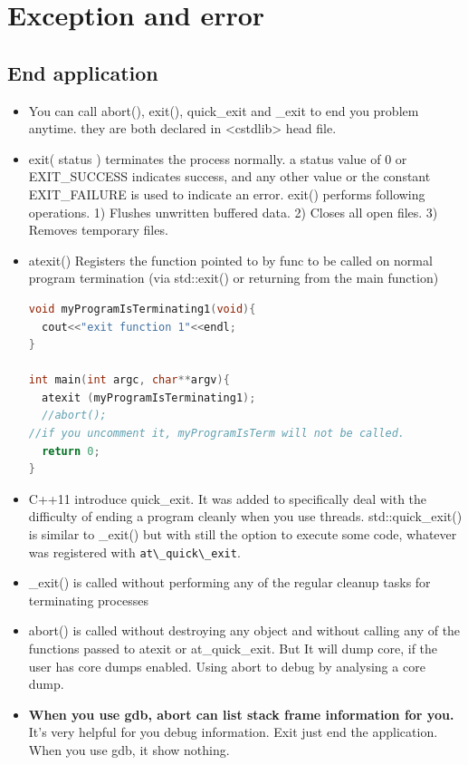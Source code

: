 \documentclass[a4paper,12pt,twoside]{book}
\begin{document}
\section{Exception and error}
\subsection{End application}
\begin{itemize}
\item You can call abort(), exit(), quick\_exit and  \_exit to end you problem anytime. they are both declared in <cstdlib> head file.

\item exit( status ) terminates the process normally.
a status value of 0 or EXIT\_SUCCESS indicates success, and any other value or the constant EXIT\_FAILURE is used to indicate an error. exit() performs following operations. 1) Flushes unwritten buffered data.
2) Closes all open files. 3) Removes temporary files.

\item atexit() Registers the function pointed to by func to be called on normal program termination (via std::exit() or returning from the main function)
\begin{lstlisting}[frame=single, language=c++]
void myProgramIsTerminating1(void){
  cout<<"exit function 1"<<endl;
}

int main(int argc, char**argv){
  atexit (myProgramIsTerminating1);
  //abort();
//if you uncomment it, myProgramIsTerm will not be called.
  return 0;
}
\end{lstlisting}

\item C++11 introduce quick\_exit. It was added to specifically deal with the difficulty of ending a program cleanly when you use threads. std::quick\_exit() is similar to \_exit() but with still the option to execute some code, whatever was registered with \verb=at\_quick\_exit=.

\item \_exit() is called without performing any of the regular cleanup tasks for terminating processes

\item abort() is called without destroying any object and without calling any of the functions passed to atexit or at\_quick\_exit. But It will dump core, if the user has core dumps enabled. Using abort to debug by analysing a core dump.

\item \textbf{When you use gdb, abort can list stack frame information for you.} It's very helpful for you debug information.  Exit just end the application. When you use gdb, it show nothing.



\end{itemize}
\end{document}

